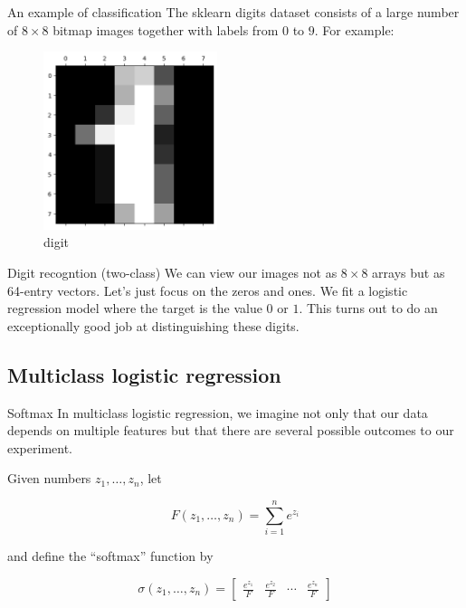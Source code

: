 \documentclass[
  ignorenonframetext,
]{beamer}
\begin{document}
\begin{frame}{An example of classification}
\protect\hypertarget{an-example-of-classification}{}
The sklearn digits dataset consists of a large number of \(8\times 8\)
bitmap images together with labels from \(0\) to \(9\). For example:

\begin{figure}
\centering
\includegraphics[width=2in,height=\textheight]{digit.png}
\caption{digit}
\end{figure}
\end{frame}

\begin{frame}{Digit recogntion (two-class)}
\protect\hypertarget{digit-recogntion-two-class}{}
We can view our images not as \(8\times 8\) arrays but as 64-entry
vectors. Let's just focus on the zeros and ones. We fit a logistic
regression model where the target is the value \(0\) or \(1\). This
turns out to do an exceptionally good job at distinguishing these
digits.
\end{frame}

\hypertarget{multiclass-logistic-regression}{%
\subsection{Multiclass logistic
regression}\label{multiclass-logistic-regression}}

\begin{frame}{Softmax}
\protect\hypertarget{softmax}{}
In multiclass logistic regression, we imagine not only that our data
depends on multiple features but that there are several possible
outcomes to our experiment.

Given numbers \(z_1,\ldots, z_n\), let

\[
F(z_1,\ldots, z_n) = \sum_{i=1}^{n} e^{z_{i}}
\]

and define the ``softmax'' function by

\[
\sigma(z_1,\ldots, z_n)=\left[\begin{matrix} \frac{e^{z_1}}{F} & \frac{e^{z_{2}}}{F} &\cdots & \frac{e^{z_{n}}}{F}\end{matrix}\right]
\]
\end{frame}
\end{document}
